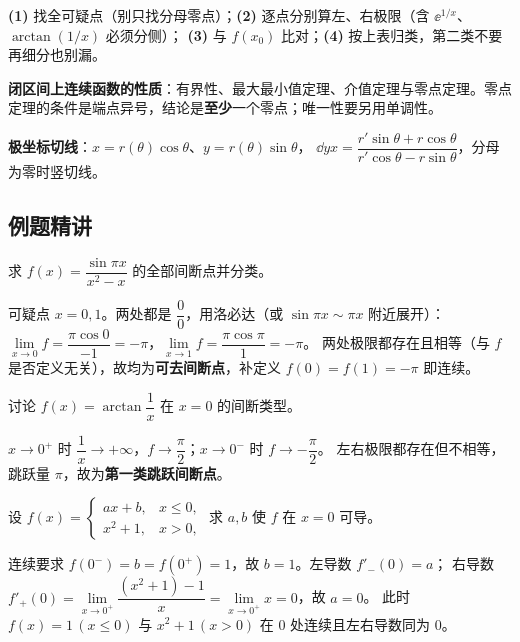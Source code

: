 \begin{keypoint}[判型四步]
\textbf{(1)} 找全可疑点（别只找分母零点）；\textbf{(2)} 逐点分别算左、右极限（含 $\ee^{1/x}$、$\arctan(1/x)$ 必须分侧）；
\textbf{(3)} 与 $f(x_0)$ 比对；\textbf{(4)} 按上表归类，第二类不要再细分也别漏。
\end{keypoint}

\noindent\textbf{闭区间上连续函数的性质}：有界性、最大最小值定理、介值定理与零点定理。零点定理的条件是端点异号，结论是\textbf{至少}一个零点；唯一性要另用单调性。

\noindent\textbf{极坐标切线}：$x=r(\theta)\cos\theta$、$y=r(\theta)\sin\theta$，
$\dd{y}{x}=\dfrac{r'\sin\theta+r\cos\theta}{r'\cos\theta-r\sin\theta}$，分母为零时竖切线。

\subsection{例题精讲}

\begin{exa}[两个可去间断点]
求 $f(x)=\dfrac{\sin\pi x}{x^2-x}$ 的全部间断点并分类。
\end{exa}
\begin{solution}
可疑点 $x=0,1$。两处都是 $\dfrac00$，用洛必达（或 $\sin\pi x\sim\pi x$ 附近展开）：
$\lim\limits_{x\to0}f=\dfrac{\pi\cos0}{-1}=-\pi$，$\lim\limits_{x\to1}f=\dfrac{\pi\cos\pi}{1}=-\pi$。
两处极限都存在且相等（与 $f$ 是否定义无关），故均为\textbf{可去间断点}，补定义 $f(0)=f(1)=-\pi$ 即连续。
\end{solution}

\begin{exa}[跳跃间断点必须分左右]
讨论 $f(x)=\arctan\dfrac1x$ 在 $x=0$ 的间断类型。
\end{exa}
\begin{solution}
$x\to0^+$ 时 $\dfrac1x\to+\infty$，$f\to\dfrac\pi2$；$x\to0^-$ 时 $f\to-\dfrac\pi2$。
左右极限都存在但不相等，跳跃量 $\pi$，故为\textbf{第一类跳跃间断点}。
\end{solution}

\begin{exa}[分段点连续且可导求参数]
设 $f(x)=\begin{cases}ax+b,&x\le0,\\ x^2+1,&x>0,\end{cases}$ 求 $a,b$ 使 $f$ 在 $x=0$ 可导。
\end{exa}
\begin{solution}
连续要求 $f(0^-)=b=f(0^+)=1$，故 $b=1$。左导数 $f'_-(0)=a$；
右导数 $f'_+(0)=\lim\limits_{x\to0^+}\dfrac{(x^2+1)-1}{x}=\lim\limits_{x\to0^+}x=0$，故 $a=0$。
此时 $f(x)=1\,(x\le0)$ 与 $x^2+1\,(x>0)$ 在 $0$ 处连续且左右导数同为 $0$。
\end{solution}

